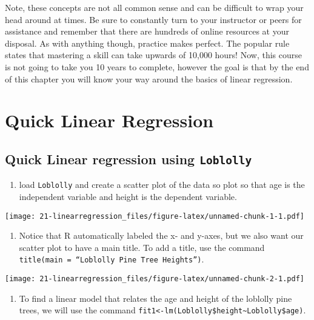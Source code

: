 \documentclass[
]{book}
\providecommand{\tightlist}{%
  \setlength{\itemsep}{0pt}\setlength{\parskip}{0pt}}
\begin{document}
Note, these concepts are not all common sense and can be difficult to wrap your head around at times. Be sure to constantly turn to your instructor or peers for assistance and remember that there are hundreds of online resources at your disposal. As with anything though, practice makes perfect. The popular rule states that mastering a skill can take upwards of 10,000 hours! Now, this course is not going to take you 10 years to complete, however the goal is that by the end of this chapter you will know your way around the basics of linear regression.

\hypertarget{quick-linear-regression}{%
\chapter{Quick Linear Regression}\label{quick-linear-regression}}

\hypertarget{quick-linear-regression-using-loblolly}{%
\section{\texorpdfstring{Quick Linear regression using \texttt{Loblolly}}{Quick Linear regression using Loblolly}}\label{quick-linear-regression-using-loblolly}}

\begin{enumerate}
\def\labelenumi{\arabic{enumi}.}
\tightlist
\item
  load \texttt{Loblolly} and create a scatter plot of the data so plot so that age is the independent variable and height is the
  dependent variable.
\end{enumerate}

\texttt{[image: 21-linearregression\_files/figure-latex/unnamed-chunk-1-1.pdf]}

\begin{enumerate}
\def\labelenumi{\arabic{enumi}.}
\setcounter{enumi}{1}
\tightlist
\item
  Notice that R automatically labeled the x- and y-axes, but we also want our scatter plot to
  have a main title. To add a title, use the command \texttt{title(main\ =\ “Loblolly\ Pine\ Tree\ Heights”)}.
\end{enumerate}

\texttt{[image: 21-linearregression\_files/figure-latex/unnamed-chunk-2-1.pdf]}

\begin{enumerate}
\def\labelenumi{\arabic{enumi}.}
\setcounter{enumi}{2}
\tightlist
\item
  To find a linear model that relates the age and height of the loblolly pine trees, we will use the
  command \texttt{fit1\textless{}-lm(Loblolly\$height\textasciitilde{}Loblolly\$age)}.
\end{enumerate}
\end{document}
